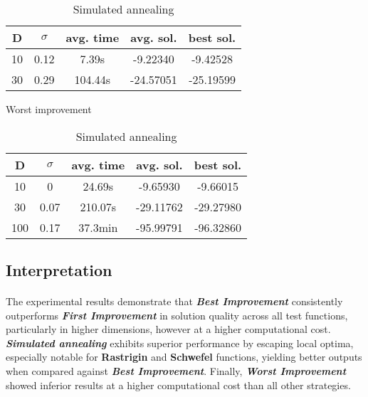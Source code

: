 \documentclass{article}
\begin{document}
\begin{table}[!htbp]
\begin{minipage}{.4\linewidth}
    \centering

    \begin{tabular}{|c|c|c|c|c|}
    \hline
    D   & $\sigma$  & avg. time     & avg. sol.     & best sol. \\
    \hline
    10  & 0.12      & 7.39s         & -9.22340      & -9.42528 \\
    \hline
    30  & 0.29      & 104.44s       & -24.57051     & -25.19599 \\
    \hline
    \end{tabular}
    \caption{Worst improvement}
  \end{minipage}%
  \quad %
  \begin{minipage}{.75\linewidth}
    \centering

    \begin{tabular}{|c|c|c|c|c|}
    \hline
    D   & $\sigma$  & avg. time     & avg. sol.     & best sol. \\
    \hline
    10  & 0         & 24.69s        & -9.65930      & -9.66015 \\
    \hline
    30  & 0.07      & 210.07s       & -29.11762     & -29.27980 \\
    \hline
    100 & 0.17      & 37.3min       & -95.99791     & -96.32860 \\
    \hline
    \end{tabular}
    \caption{Simulated annealing}
  \end{minipage}
\end{table}


\subsection{Interpretation}

\paragraph{}
The experimental results demonstrate that \textit{\textbf{Best Improvement}} consistently outperforms \textit{\textbf{First Improvement}} in solution quality across all test functions, particularly in higher dimensions, however at a higher computational cost. \textit{\textbf{Simulated annealing}} exhibits superior performance by escaping local optima, especially notable for \textbf{Rastrigin} and \textbf{Schwefel} functions, yielding better outputs when compared against \textit{\textbf{Best Improvement}}. Finally, \textit{\textbf{Worst Improvement}} showed inferior results at a higher computational cost than all other strategies.
\end{document}
